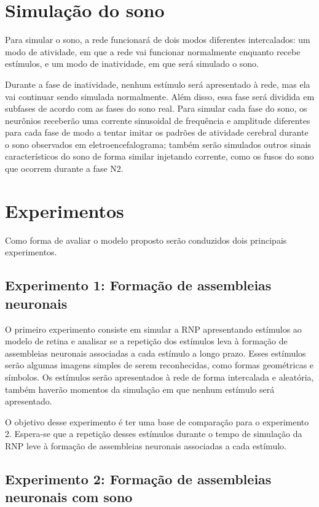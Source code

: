 \section{Simulação do sono}

Para simular o sono, a rede funcionará de dois modos diferentes intercalados: um modo de atividade, em que a rede vai funcionar
normalmente enquanto recebe estímulos, e um modo de inatividade, em que será simulado o sono. 

Durante a fase de inatividade, nenhum estímulo será apresentado à rede, mas ela vai continuar sendo simulada normalmente. Além
disso, essa fase será dividida em subfases de acordo com as fases do sono real. Para simular cada fase do sono, os neurônios
receberão uma corrente sinusoidal de frequência e amplitude diferentes para cada fase de modo a tentar imitar os padrões de
atividade cerebral durante o sono observados em eletroencefalograma; também serão simulados outros sinais característicos do sono
de forma similar injetando corrente, como os fusos do sono que ocorrem durante a fase N2.

\section{Experimentos}\label{section_experimento}

Como forma de avaliar o modelo proposto serão conduzidos dois principais experimentos.

\subsection{Experimento 1: Formação de assembleias neuronais}

O primeiro experimento consiste em simular a RNP apresentando estímulos ao modelo de retina e analisar se a repetição dos
estímulos leva à formação de assembleias neuronais associadas a cada estímulo a longo prazo. Esses estímulos serão algumas imagens
simples de serem reconhecidas, como formas geométricas e símbolos. Os estímulos serão apresentados à rede de forma intercalada e
aleatória, também haverão momentos da simulação em que nenhum estímulo será apresentado. 

O objetivo desse experimento é ter uma base de comparação para o experimento 2. Espera-se que a repetição desses
estímulos durante o tempo de simulação da RNP leve à formação de assembleias neuronais associadas a cada estímulo.

\subsection{Experimento 2: Formação de assembleias neuronais com sono}

